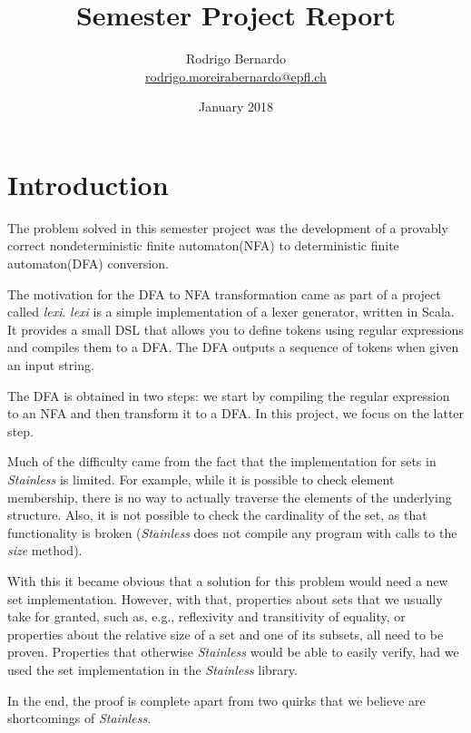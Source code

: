 \documentclass[12pt, a4paper]{article}
\makeatletter
\theoremstyle{break}
\newcommand{\email}[1]{\href{mailto:#1@epfl.ch}{#1@epfl.ch}}
\newcommand{\nfa}{nondeterministic finite automaton\xspace}
\newcommand{\dfa}{deterministic finite automaton\xspace}
\makeatother
\begin{document}
\title{Semester Project Report}

\author{
  Rodrigo Bernardo\\
  \email{rodrigo.moreirabernardo}\\
}

\date{{January 2018}}
\maketitle

\section{Introduction}

The problem solved in this semester project was the development of a provably
correct \nfa (NFA) to \dfa (DFA) conversion.

The motivation for the DFA to NFA transformation came as part of a project
called \textit{lexi}. \textit{lexi} is a simple implementation of a lexer
generator, written in Scala. It provides a small DSL that allows you to define
tokens using regular expressions and compiles them to a DFA. The DFA outputs a
sequence of tokens when given an input string.

The DFA is obtained in two steps: we start by compiling the regular expression
to an NFA and then transform it to a DFA. In this project, we focus on the
latter step.

Much of the difficulty came from the fact that the implementation for sets in
\textit{Stainless} is limited. For example, while it is possible to check
element membership, there is no way to actually traverse the elements of the
underlying structure. Also, it is not possible to check the cardinality of the
set, as that functionality is broken (\textit{Stainless} does not compile any
program with calls to the \textit{size} method).

With this it became obvious that a solution for this problem would need a new
set implementation. However, with that, properties about sets that we usually
take for granted, such as, e.g., reflexivity and transitivity of equality, or
properties about the relative size of a set and one of its subsets, all need to
be proven. Properties that otherwise \textit{Stainless} would be able to
easily verify, had we used the set implementation in the \textit{Stainless}
library.

In the end, the proof is complete apart from two quirks that we believe are
shortcomings of \textit{Stainless}.
\end{document}

